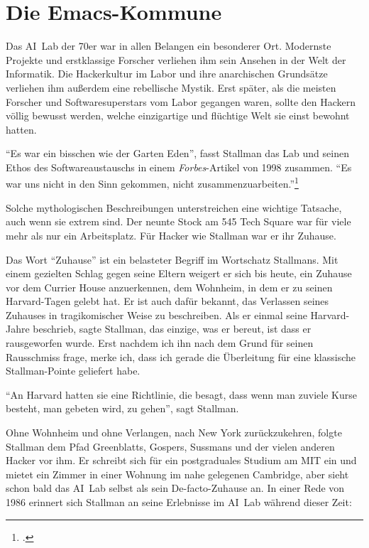 \chapter{Die Emacs-Kommune}


Das AI~Lab der 70er war in allen Belangen ein besonderer Ort. Modernste Projekte und erstklassige Forscher verliehen ihm sein Ansehen in der Welt der Informatik. Die Hackerkultur im Labor und ihre anarchischen Grundsätze verliehen ihm außerdem eine rebellische Mystik. Erst später, als die meisten Forscher und Softwaresuperstars vom Labor gegangen waren, sollte den Hackern völlig bewusst werden, welche einzigartige und flüchtige Welt sie einst bewohnt hatten.

"`Es war ein bisschen wie der Garten Eden"', fasst Stallman das Lab und seinen Ethos des Softwareaustauschs in einem \textit{Forbes}-Artikel von 1998 zusammen. "`Es war uns nicht in den Sinn gekommen, nicht zusammenzuarbeiten."'\footcite[Vgl.][]{loveofhacking}

Solche mythologischen Beschreibungen unterstreichen eine wichtige Tatsache, auch wenn sie extrem sind. Der neunte Stock am 545 Tech Square war für viele mehr als nur ein Arbeitsplatz. Für Hacker wie Stallman war er ihr Zuhause.

Das Wort "`Zuhause"' ist ein belasteter Begriff im Wortschatz Stallmans. Mit einem gezielten Schlag gegen seine Eltern weigert er sich bis heute, ein Zuhause vor dem Currier House anzuerkennen, dem Wohnheim, in dem er zu seinen Harvard-Tagen gelebt hat. Er ist auch dafür bekannt, das Verlassen seines Zuhauses in tragikomischer Weise zu beschreiben. Als er einmal seine Harvard-Jahre beschrieb, sagte Stallman, das einzige, was er bereut, ist dass er rausgeworfen wurde. Erst nachdem ich ihn nach dem Grund für seinen Rausschmiss frage, merke ich, dass ich gerade die Überleitung für eine klassische Stallman-Pointe geliefert habe.

"`An Harvard hatten sie eine Richtlinie, die besagt, dass wenn man zuviele Kurse besteht, man gebeten wird, zu gehen"', sagt Stallman.

Ohne Wohnheim und ohne Verlangen, nach New York zurückzukehren, folgte Stallman dem Pfad Greenblatts, Gospers, Sussmans und der vielen anderen Hacker vor ihm. Er schreibt sich für ein postgraduales Studium am MIT ein und mietet ein Zimmer in einer Wohnung im nahe gelegenen Cambridge, aber sieht schon bald das AI~Lab selbst als sein De-facto-Zuhause an. In einer Rede von 1986 erinnert sich Stallman an seine Erlebnisse im AI~Lab während dieser Zeit:

